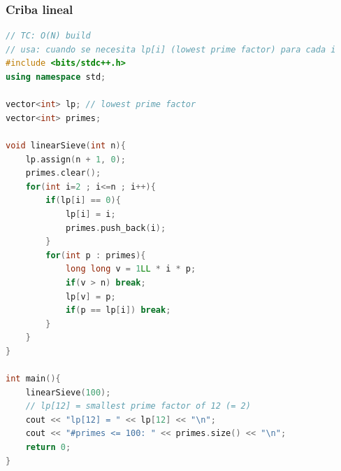 \subsubsection{Criba lineal}
\begin{lstlisting}[style=mystyle, language=C++]
// TC: O(N) build
// usa: cuando se necesita lp[i] (lowest prime factor) para cada i
#include <bits/stdc++.h>
using namespace std;

vector<int> lp; // lowest prime factor
vector<int> primes;

void linearSieve(int n){
	lp.assign(n + 1, 0);
	primes.clear();
	for(int i=2 ; i<=n ; i++){
		if(lp[i] == 0){
			lp[i] = i;
			primes.push_back(i);
		}
		for(int p : primes){
			long long v = 1LL * i * p;
			if(v > n) break;
			lp[v] = p;
			if(p == lp[i]) break;
		}
	}
}

int main(){
	linearSieve(100);
	// lp[12] = smallest prime factor of 12 (= 2)
	cout << "lp[12] = " << lp[12] << "\n";
	cout << "#primes <= 100: " << primes.size() << "\n";
	return 0;
}
\end{lstlisting}
